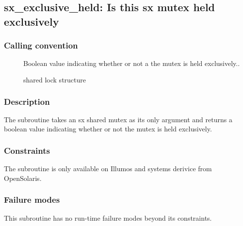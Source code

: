 \clearpage
{}
{}
\label{subr:sx-exclusive-held}
\subsection*{sx\_exclusive\_held: Is this sx mutex held exclusively }

\subsubsection*{Calling convention}

\begin{description}
\item[] Boolean value indicating whether or not a
  the mutex is held exclusively..
\item[] shared lock structure
\end{description}

\subsubsection*{Description}

The  subroutine takes an sx shared mutex
as its only argument and returns a boolean value indicating whether or
not the mutex is held exclusively.

\subsubsection*{Constraints}

The  subroutine is only available on Illumos and
systems derivice from OpenSolaris.

\subsubsection*{Failure modes}

This subroutine has no run-time failure modes beyond its constraints.

